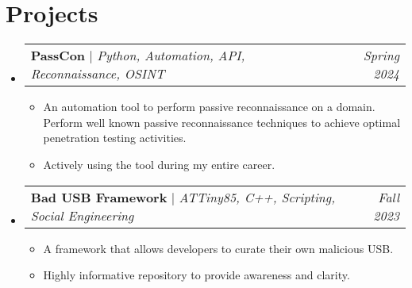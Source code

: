 \documentclass[letterpaper,10pt]{article}
\makeatletter
\newcommand{\subheadingtitlevspace}{
	\vspace{-3pt}
}
\newcommand{\resumeItem}[1]{
	\item{
		{#1 \vspace{-4pt}}
	}
}
\newcommand{\titleItem}[1]{
	\textbf{#1}
}
\newcommand{\resumeProjectHeading}[2]{
	\item
	\begin{tabular*}{0.97\textwidth}{l@{\extracolsep{\fill}}r}
		#1 & \textit{ #2} \\
	\end{tabular*}\vspace{-9pt}
}
\newcommand{\resumeSubHeadingListStart}{\subheadingtitlevspace\begin{itemize}[leftmargin=0.15in, label={}]}
\newcommand{\resumeSubHeadingListEnd}{\end{itemize}}
\newcommand{\resumeItemListStart}{
	\begin{itemize}}
\newcommand{\resumeItemListEnd}{
	\end{itemize}\vspace{-8pt}}
\makeatother
\begin{document}
	\section{Projects}    
	\resumeSubHeadingListStart
	\resumeProjectHeading
	{\titleItem{PassCon} $|$ \emph{Python, Automation, API, Reconnaissance, OSINT}}{Spring 2024}
	\resumeItemListStart
	\resumeItem{An automation tool to perform passive reconnaissance on a domain. Perform well known passive reconnaissance techniques to achieve optimal penetration testing activities.}
	\resumeItem{Actively using the tool during my entire career.}
	\resumeItemListEnd
	\resumeProjectHeading
	{\titleItem{Bad USB Framework} $|$ \emph{ATTiny85, C++, Scripting, Social Engineering}}{Fall 2023}
	\resumeItemListStart
	\resumeItem{A framework that allows developers to curate their own malicious USB.} 
	\resumeItem{Highly informative repository to provide awareness and clarity.}
	\resumeItemListEnd
	\resumeSubHeadingListEnd
	
\end{document}
